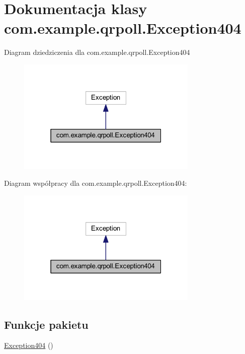 \hypertarget{classcom_1_1example_1_1qrpoll_1_1_exception404}{\section{Dokumentacja klasy com.\+example.\+qrpoll.\+Exception404}
\label{classcom_1_1example_1_1qrpoll_1_1_exception404}
}


Diagram dziedziczenia dla com.\+example.\+qrpoll.\+Exception404
\nopagebreak
\begin{figure}[H]
\begin{center}
\leavevmode
\includegraphics[width=244pt]{classcom_1_1example_1_1qrpoll_1_1_exception404__inherit__graph}
\end{center}
\end{figure}


Diagram współpracy dla com.\+example.\+qrpoll.\+Exception404\+:
\nopagebreak
\begin{figure}[H]
\begin{center}
\leavevmode
\includegraphics[width=244pt]{classcom_1_1example_1_1qrpoll_1_1_exception404__coll__graph}
\end{center}
\end{figure}
\subsection*{Funkcje pakietu}
\begin{DoxyCompactItemize}
\item 
\hyperlink{classcom_1_1example_1_1qrpoll_1_1_exception404_a8927591383f273a89d49e4bf6f536961}{Exception404} ()
\end{DoxyCompactItemize}


